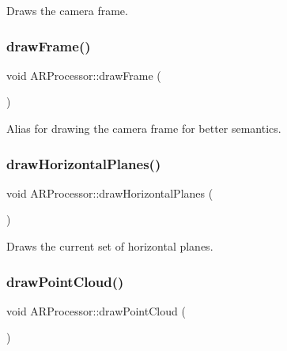 Draws the camera frame. 

\mbox{\label{class_a_r_processor_a685469fa6b66b8b5d935f6f45a2ef599}} 
\subsubsection{\texorpdfstring{draw\+Frame()}{drawFrame()}}
{\footnotesize\ttfamily void A\+R\+Processor\+::draw\+Frame (\begin{DoxyParamCaption}{ }\end{DoxyParamCaption})}



Alias for drawing the camera frame for better semantics. 

\mbox{\label{class_a_r_processor_a6a61a7e03821410bc1a715fd32159662}} 
\subsubsection{\texorpdfstring{draw\+Horizontal\+Planes()}{drawHorizontalPlanes()}}
{\footnotesize\ttfamily void A\+R\+Processor\+::draw\+Horizontal\+Planes (\begin{DoxyParamCaption}{ }\end{DoxyParamCaption})}



Draws the current set of horizontal planes. 

\mbox{\label{class_a_r_processor_ae938bf188d56d8b30b141b2fa23e96f8}} 
\subsubsection{\texorpdfstring{draw\+Point\+Cloud()}{drawPointCloud()}}
{\footnotesize\ttfamily void A\+R\+Processor\+::draw\+Point\+Cloud (\begin{DoxyParamCaption}{ }\end{DoxyParamCaption})}




